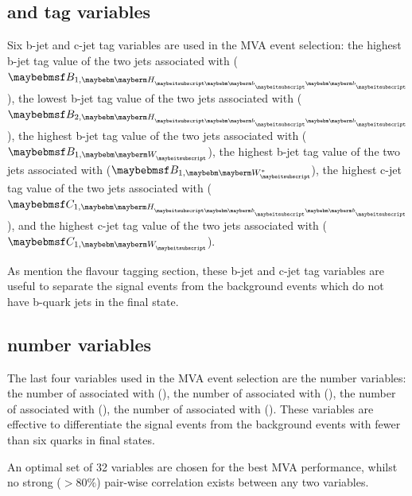 \subsection{\Pbottom and \Pcharm tag  variables}

Six b-jet and c-jet tag variables are used in the MVA event selection: the highest b-jet tag value of the two jets associated with \Hbb ($\btagFull{1,\Hbb}$), the lowest b-jet tag value of the two jets associated with \Hbb ($\btagFull{2,\Hbb}$), the highest b-jet tag value of the two jets associated with \PW ($\btagFull{1,\PW}$), the highest b-jet tag value of the two jets associated with \W* ($\btagFull{1,\W*}$), the highest c-jet tag value of the two jets associated with \Hbb ($\ctagFull{1,\Hbb}$), and the highest c-jet tag value of the two jets associated with \PW ($\ctagFull{1,\PW}$).

As mention the flavour tagging section, these b-jet and c-jet tag variables are useful to separate the signal events from the background events which do not have b-quark jets in the final state.

\subsection{\PFOs number  variables}

The last four variables used in the MVA event selection are the \PFOs number  variables: the number of \PFOs associated with \Hbb (\Hbb), the number of \PFOs associated with \HWW (\HWW), the number of \PFOs associated with \PW (\PW), the number of \PFOs associated with \W* (\W*). These variables are effective to differentiate the signal events from the background events with fewer than six quarks in final states.

An optimal set of 32 variables are chosen for the best MVA performance, whilst no strong ($>80\%$) pair-wise correlation exists between any two variables. %

